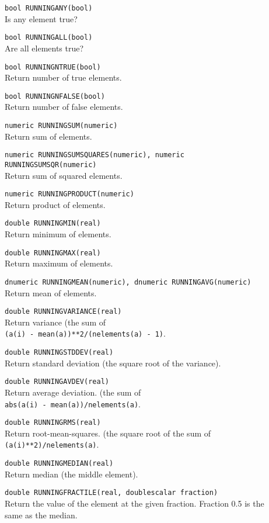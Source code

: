 \begin{description}
  \item[] \texttt{bool RUNNINGANY(bool)}\\
    Is any element true?
  \item[] \texttt{bool RUNNINGALL(bool)}\\
    Are all elements true?
  \item[] \texttt{bool RUNNINGNTRUE(bool)}\\
    Return number of true elements.
  \item[] \texttt{bool RUNNINGNFALSE(bool)}\\
    Return number of false elements.
  \item[] \texttt{numeric RUNNINGSUM(numeric)}\\
    Return sum of elements.
  \item[] \texttt{numeric RUNNINGSUMSQUARES(numeric), numeric RUNNINGSUMSQR(numeric)}\\
    Return sum of squared elements.
  \item[] \texttt{numeric RUNNINGPRODUCT(numeric)}\\
    Return product of elements.
  \item[] \texttt{double RUNNINGMIN(real)}\\
    Return minimum of elements.
  \item[] \texttt{double RUNNINGMAX(real)}\\
    Return maximum of elements.
  \item[] \texttt{dnumeric RUNNINGMEAN(numeric), dnumeric RUNNINGAVG(numeric)}\\
    Return mean of elements.
  \item[] \texttt{double RUNNINGVARIANCE(real)}\\
    Return variance (the sum of
    \\\texttt{(a(i) - mean(a))**2/(nelements(a) - 1)}.
  \item[] \texttt{double RUNNINGSTDDEV(real)}\\
    Return standard deviation (the square root of the variance).
  \item[] \texttt{double RUNNINGAVDEV(real)}\\
    Return average deviation. (the sum of 
    \\\texttt{abs(a(i) - mean(a))/nelements(a)}.
  \item[] \texttt{double RUNNINGRMS(real)}\\
    Return root-mean-squares. (the square root of the sum of
    \\\texttt{(a(i)**2)/nelements(a)}.
  \item[] \texttt{double RUNNINGMEDIAN(real)}\\
    Return median (the middle element).
  \item[] \texttt{double RUNNINGFRACTILE(real, doublescalar fraction)}\\
    Return the value of the element at the given fraction.
    Fraction 0.5 is the same as the median.
\end{description}

